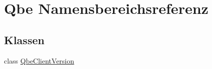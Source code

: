 \hypertarget{namespaceQbe}{
\section{Qbe Namensbereichsreferenz}
\label{namespaceQbe}
}




\subsection*{Klassen}
\begin{CompactItemize}
\item 
class \hyperlink{classQbe_1_1QbeClientVersion}{Qbe\-Client\-Version}
\end{CompactItemize}
